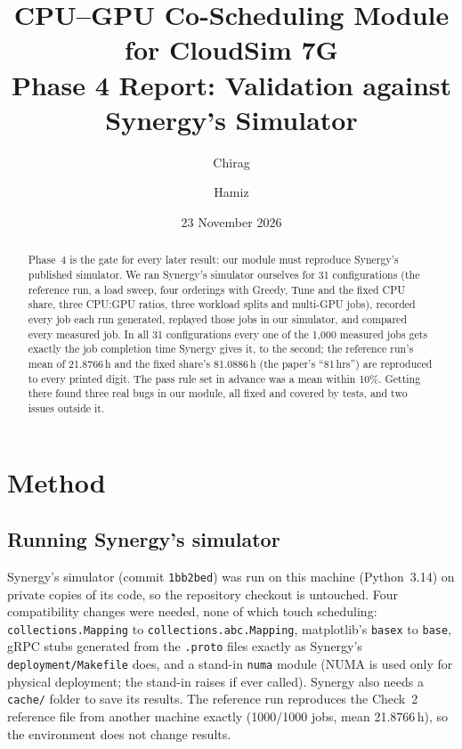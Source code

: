 \documentclass[11pt,a4paper]{article}
\title{CPU--GPU Co-Scheduling Module for CloudSim 7G\\[4pt]
\large Phase 4 Report: Validation against Synergy's Simulator}
\author{Chirag \and Hamiz}
\date{23 November 2026}
\newcommand{\code}[1]{\texttt{#1}}
\begin{document}
\maketitle

\begin{abstract}
Phase~4 is the gate for every later result: our module must reproduce Synergy's published simulator. We ran
Synergy's simulator ourselves for 31 configurations (the reference run, a load sweep, four orderings with
Greedy, Tune and the fixed CPU share, three CPU:GPU ratios, three workload splits and multi-GPU jobs), recorded
every job each run generated, replayed those jobs in our simulator, and compared every measured job. In all
31 configurations every one of the 1{,}000 measured jobs gets exactly the job completion time Synergy gives it,
to the second; the reference run's mean of 21.8766\,h and the fixed share's 81.0886\,h (the paper's
``81\,hrs'') are reproduced to every printed digit. The pass rule set in advance was a mean within 10\%.
Getting there found three real bugs in our module, all fixed and covered by tests, and two issues outside it.
\end{abstract}

\tableofcontents

\section{Method}

\subsection{Running Synergy's simulator}
Synergy's simulator (commit \code{1bb2bed}) was run on this machine (Python~3.14) on private copies of its code,
so the repository checkout is untouched. Four compatibility changes were needed, none of which touch scheduling:
\code{collections.Mapping} to \code{collections.abc.Mapping}, matplotlib's \code{basex} to \code{base}, gRPC stubs
generated from the \code{.proto} files exactly as Synergy's \code{deployment/Makefile} does, and a stand-in
\code{numa} module (NUMA is used only for physical deployment; the stand-in raises if ever called). Synergy also
needs a \code{cache/} folder to save its results. The reference run reproduces the Check~2 reference file from
another machine exactly (1000/1000 jobs, mean 21.8766\,h), so the environment does not change results.
\end{document}
